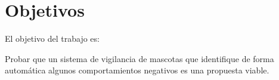 \section{Objetivos}
\label{sec:objetivos}


El objetivo del trabajo es:

\begin{quotebox}
  Probar que un sistema de vigilancia de mascotas que identifique de forma automática algunos comportamientos negativos es una propuesta viable.
\end{quotebox}




